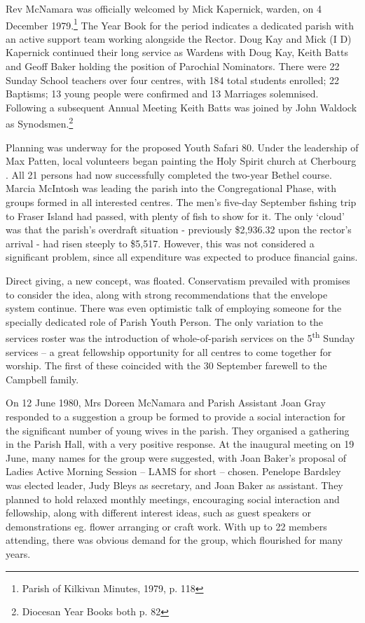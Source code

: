 Rev McNamara was officially welcomed by Mick Kapernick, warden, on 4 December 1979.\footnote{Parish of Kilkivan Minutes, 1979, p. 118} The Year Book for the period indicates a dedicated parish with an active support team working alongside the Rector. Doug Kay and Mick (I D) Kapernick continued their long service as Wardens with Doug Kay, Keith Batts and Geoff Baker holding the position of Parochial Nominators. There were 22 Sunday School teachers over four centres, with 184 total students enrolled; 22 Baptisms; 13 young people were confirmed and 13 Marriages solemnised. Following a subsequent Annual Meeting Keith Batts was joined by John Waldock as Synodsmen.\footnote{Diocesan Year Books both p. 82}


Planning was underway for the proposed Youth Safari 80. Under the leadership of Max Patten, local volunteers began painting the Holy Spirit church at Cherbourg . All 21 persons had now successfully completed the two-year Bethel course. Marcia McIntosh was leading the parish into the Congregational Phase, with groups formed in all interested centres. The men's five-day September fishing trip to Fraser Island had passed, with plenty of fish to show for it. The only `cloud' was that the parish's overdraft situation - previously \$2,936.32 upon the rector's arrival - had risen steeply to \$5,517. However, this was not considered a significant problem, since all expenditure was expected to produce financial gains.



Direct giving, a new concept, was floated. Conservatism prevailed with promises to consider the idea, along with strong recommendations that the envelope system continue. There was even optimistic talk of employing someone for the specially dedicated role of Parish Youth Person. The only variation to the services roster was the introduction of whole-of-parish services on the 5\textsuperscript{th} Sunday services -- a great fellowship opportunity for all centres to come together for worship. The first of these coincided with the 30 September farewell to the Campbell family.



On 12 June 1980, Mrs Doreen McNamara and Parish Assistant Joan Gray responded to a suggestion a group be formed to provide a social interaction for the significant number of young wives in the parish. They organised a gathering in the Parish Hall, with a very positive response. At the inaugural meeting on 19 June, many names for the group were suggested, with Joan Baker's proposal of Ladies Active Morning Session -- LAMS for short -- chosen. Penelope Bardsley was elected leader, Judy Bleys as secretary, and Joan Baker as assistant. They planned to hold relaxed monthly meetings, encouraging social interaction and fellowship, along with different interest ideas, such as guest speakers or demonstrations eg. flower arranging or craft work. With up to 22 members attending, there was obvious demand for the group, which flourished for many years.



